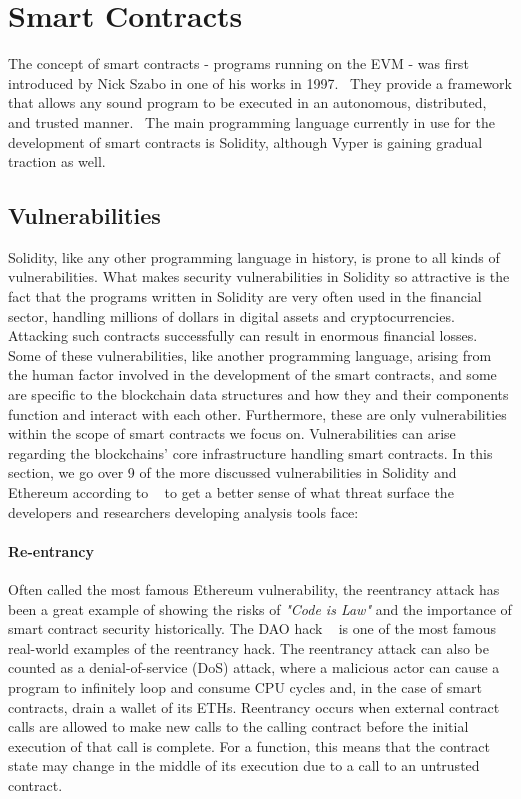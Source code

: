 \section{Smart Contracts}
    The concept of smart contracts - programs running on the EVM - was first introduced by Nick Szabo in one of his works in 1997.~\cite{szabo1997formalizing}
    They provide a framework that allows any sound program to be executed in an autonomous, distributed, and trusted manner.~\cite{nguyen2020sfuzz}
    The main programming language currently in use for the development of smart contracts is Solidity, although Vyper is gaining gradual traction as well.

    \subsection{Vulnerabilities}
        Solidity, like any other programming language in history, is prone to all kinds of vulnerabilities.
        What makes security vulnerabilities in Solidity so attractive is the fact that the programs written in Solidity are very often used in the financial sector,
        handling millions of dollars in digital assets and cryptocurrencies. Attacking such contracts successfully can result in enormous financial losses.
        Some of these vulnerabilities, like another programming language, arising from the human factor involved in the development of the smart contracts, and some are specific to the blockchain data structures and how they and their components function and interact with each other.
        Furthermore, these are only vulnerabilities within the scope of smart contracts we focus on. Vulnerabilities can arise regarding the blockchains' core infrastructure handling smart contracts.
        In this section, we go over 9 of the more discussed vulnerabilities in Solidity and Ethereum according to ~\cite{dasp} to get a better sense of what threat surface the developers and researchers developing analysis tools face:

            \paragraph{Re-entrancy}
            Often called the most famous Ethereum vulnerability, the reentrancy attack has been a great example of showing the risks of \textit{"Code is Law"} and the importance of smart contract security historically.
            The DAO hack ~\cite{dhillon2017dao} is one of the most famous real-world examples of the reentrancy hack.
            The reentrancy attack can also be counted as a denial-of-service (DoS) attack, where a malicious actor can cause a program to infinitely loop and consume CPU cycles and, in the case of smart contracts, drain a wallet of its ETHs.
            Reentrancy occurs when external contract calls are allowed to make new calls to the calling contract before the initial execution of that call is complete.
            For a function, this means that the contract state may change in the middle of its execution due to a call to an untrusted contract. ~\cite{dasp}

